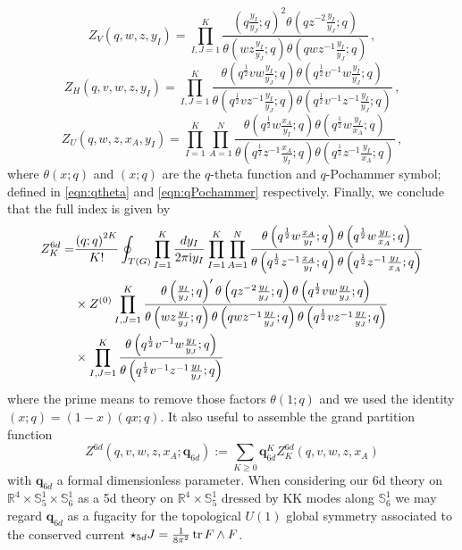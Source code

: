 \documentclass[main.tex]{subfiles}
\begin{document}
\begin{equation}
Z_V(q,w,z,y_I)=\prod_{I,J=1}^K\frac{\left(q\frac{y_I}{y_J};q\right)^2\theta\left(qz^{-2}\frac{y_I}{y_J};q\right)}{\theta\left(wz\frac{y_I}{y_J};q\right)\theta\left(qwz^{-1}\frac{y_I}{y_J};q\right)}\,,
\end{equation}
\begin{equation}
Z_H(q,v,w,z,y_I)=\prod_{I,J=1}^K\frac{\theta\left(q^{\frac{1}{2}}vw\frac{y_I}{y_J};q\right)\theta\left(q^{\frac{1}{2}}v^{-1}w\frac{y_I}{y_J};q\right)}{\theta\left(q^{\frac{1}{2}}vz^{-1}\frac{y_I}{y_J};q\right)\theta\left(q^{\frac{1}{2}}v^{-1}z^{-1}\frac{y_I}{y_J};q\right)}\,,
\end{equation}
\begin{equation}
Z_U(q,w,z,x_A,y_I)=\prod_{I=1}^K\prod_{A=1}^N\frac{\theta\left(q^{\frac{1}{2}}w\frac{x_A}{y_I};q\right)\theta\left(q^{\frac{1}{2}}w\frac{y_I}{x_A};q\right)}{\theta\left(q^{\frac{1}{2}}z^{-1}\frac{x_A}{y_I};q\right)\theta\left(q^{\frac{1}{2}}z^{-1}\frac{y_I}{x_A};q\right)}\,,
\end{equation}
where $\theta(x;q)$ and $(x;q)$ are the $q$-theta function and $q$-Pochammer symbol; defined in \eqref{eqn:qtheta} and \eqref{eqn:qPochammer} respectively.
Finally, we conclude that the full index is given by
\begin{equation}\label{eqn:6dpartitionfunctionK}
\begin{aligned}
Z^{6d}_K=&\frac{\left(q;q\right)^{2K}}{K!}\oint_{T(G)}\prod_{I=1}^K\frac{dy_I}{2\pi\mathrm{i} y_I}\prod_{I=1}^K\prod_{A=1}^N\frac{\theta\left(q^{\frac{1}{2}}w\frac{x_A}{y_I};q\right)\theta\left(q^{\frac{1}{2}}w\frac{y_I}{x_A};q\right)}{\theta\left(q^{\frac{1}{2}}z^{-1}\frac{x_A}{y_I};q\right)\theta\left(q^{\frac{1}{2}}z^{-1}\frac{y_I}{x_A};q\right)}\\
&\times Z^{(0)}\prod_{I,J=1}^K\frac{\theta\left(\frac{y_I}{y_J};q\right)'\theta\left(qz^{-2}\frac{y_I}{y_J};q\right)\theta\left(q^{\frac{1}{2}}vw\frac{y_I}{y_J};q\right)}{\theta\left(wz\frac{y_I}{y_J};q\right)\theta\left(qwz^{-1}\frac{y_I}{y_J};q\right)\theta\left(q^{\frac{1}{2}}vz^{-1}\frac{y_I}{y_J};q\right)}\\
&\times\prod_{I,J=1}^K\frac{\theta\left(q^{\frac{1}{2}}v^{-1}w\frac{y_I}{y_J};q\right)}{\theta\left(q^{\frac{1}{2}}v^{-1}z^{-1}\frac{y_I}{y_J};q\right)}
\end{aligned}
\end{equation}
where the prime means to remove those factors $\theta(1;q)$ and we used the identity $\left(x;q\right)=\left(1-x\right)\left(qx;q\right)$. It also useful to assemble the grand partition function
\begin{equation}\label{eqn:6dpartitionfunction1}
Z^{6d}(q,v,w,z,x_A;\mathbf{q}_{6d}):=\sum_{K\geq0}\mathbf{q}^K_{6d}Z^{6d}_K(q,v,w,z,x_A)
\end{equation}
with $\mathbf{q}_{6d}$ a formal dimensionless parameter. When considering our 6d theory on $\mathbb{R}^4\times \mathbb{S}_5^1\times \mathbb{S}_6^1$ as a 5d theory on $\mathbb{R}^4\times \mathbb{S}_5^1$ dressed by KK modes along  $\mathbb{S}_6^1$ we may regard $\mathbf{q}_{6d}$ as a fugacity for the topological $U(1)$ global symmetry associated to the conserved current $\star_{5d}J=\frac{1}{8\pi^2}\operatorname{tr} F\wedge F$. 
\end{document}
